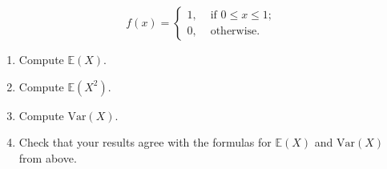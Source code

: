 \documentclass[12pt, reqno]{amsart}
\newcommand{\E}{\mathbb{E}}
\newcommand{\Var}{\mathrm{Var}}
\theoremstyle{remark}
\begin{document}
\begin{enumerate}
\[          f(x)=
          \begin{cases}
               1,&\text{ if }0\leq x\leq 1;\\
               0,&\text{ otherwise}.
          \end{cases}\]
          \begin{enumerate}
               \item\label{exc:uniform_a} Compute \(\E(X)\).
               \item\label{exc:uniform_b} Compute \(\E(X^{2})\).
               \item\label{exc:uniform_c} Compute \(\Var(X)\).
               \item\label{exc:uniform_d} Check that your results agree with the formulas for \(\E(X)\) and \(\Var(X)\) from above. 
          \end{enumerate}
\end{enumerate}
\end{document}
